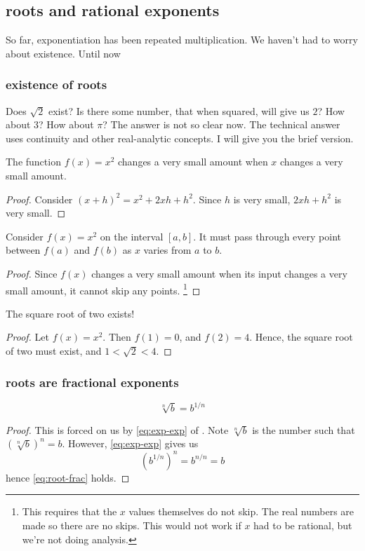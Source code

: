 \documentclass[10pt]{scrartcl}
\begin{document}
\subsection{roots and rational exponents}
So far, exponentiation has been repeated multiplication. We haven't had to worry about existence. Until now
\subsubsection{existence of roots}
Does $\sqrt{2}$ exist? Is there some number, that when squared, will give us $2$? How about $3$? How about $\pi$? The answer is not so clear now. The technical answer uses continuity and other real-analytic concepts. I will give you the brief version. 
\begin{lemma}
  The function $f(x)=x^2$ changes a very small amount when $x$ changes a very small amount. 
\end{lemma}
\begin{proof}
  Consider $(x+h)^2=x^2+2xh+h^2$. Since $h$ is very small, $2xh+h^2$ is very small. 
\end{proof}

\begin{cor}
  Consider $f(x)=x^2$ on the interval $[a,b]$. It must pass through every point between $f(a)$ and $f(b)$ as $x$ varies from $a$ to $b$.
\end{cor}
\begin{proof}
  Since $f(x)$ changes a very small amount when its input changes a very small amount,  it cannot skip any points. \footnote{This requires that the $x$ values themselves do not skip. The real numbers are made so there are no skips. This would not work if $x$ had to be rational, but we're not doing analysis.}
\end{proof}

\begin{theorem}
  The square root of two exists!
\end{theorem}
\begin{proof}
  Let $f(x)=x^2$. Then $f(1)=0$, and $f(2)=4$. Hence, the square root of two must exist, and $1<\sqrt 2 < 4$. 
\end{proof}

\subsubsection{roots are fractional exponents}
\begin{theorem}
  \begin{equation}
    \label{eq:root-frac}
    \sqrt[n]{b}=b^{1/n}
  \end{equation}
\end{theorem}
\begin{proof}
  This is forced on us by \cref{eq:exp-exp} of . Note $\sqrt[n]{b}$ is the number such that $(\sqrt[n]{b})^n=b$. However, \cref{eq:exp-exp} gives us 
  \[
  \left(b^{1/n}\right)^n=b^{n/n}=b
  \]
  hence \cref{eq:root-frac} holds. 
\end{proof}
\end{document}
